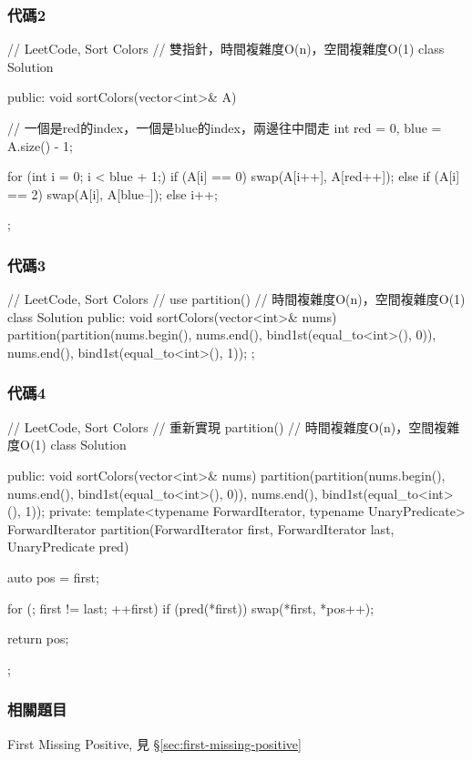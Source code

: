 \subsubsection{代碼2}
\begin{Code}
// LeetCode, Sort Colors
// 雙指針，時間複雜度O(n)，空間複雜度O(1)
class Solution {
public:
    void sortColors(vector<int>& A) {
        // 一個是red的index，一個是blue的index，兩邊往中間走
        int red = 0, blue = A.size() - 1;

        for (int i = 0; i < blue + 1;) {
            if (A[i] == 0)
                swap(A[i++], A[red++]);
            else if (A[i] == 2)
                swap(A[i], A[blue--]);
            else
                i++;
        }
    }
};
\end{Code}


\subsubsection{代碼3}
\begin{Code}
// LeetCode, Sort Colors
// use partition()
// 時間複雜度O(n)，空間複雜度O(1)
class Solution {
public:
    void sortColors(vector<int>& nums) {
        partition(partition(nums.begin(), nums.end(), bind1st(equal_to<int>(), 0)),
                nums.end(), bind1st(equal_to<int>(), 1));
    }
};
\end{Code}


\subsubsection{代碼4}
\begin{Code}
// LeetCode, Sort Colors
// 重新實現 partition()
// 時間複雜度O(n)，空間複雜度O(1)
class Solution {
public:
    void sortColors(vector<int>& nums) {
        partition(partition(nums.begin(), nums.end(), bind1st(equal_to<int>(), 0)),
                 nums.end(), bind1st(equal_to<int>(), 1));
    }
private:
    template<typename ForwardIterator, typename UnaryPredicate>
    ForwardIterator partition(ForwardIterator first, ForwardIterator last,
            UnaryPredicate pred) {
        auto pos = first;

        for (; first != last; ++first)
            if (pred(*first))
                swap(*first, *pos++);

        return pos;
    }
};
\end{Code}


\subsubsection{相關題目}
\begindot
\item First Missing Positive, 見 \S \ref{sec:first-missing-positive}
\myenddot


